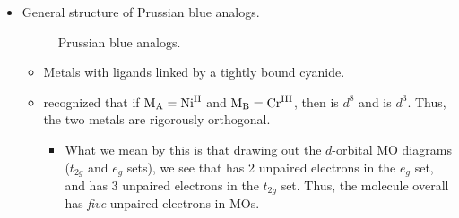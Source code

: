 \documentclass[../notes.tex]{subfiles}
\begin{document}
\begin{itemize}
    \begin{figure}[h!]
        \centering
        \footnotesize
        \chemleft{[}
        \chemright{]^+}
        \caption{Designing a compound with orthogonal electrons.}
        \label{fig:orthogonalElectrons}
    \end{figure}
    \begin{itemize}
        \item The compound in Figure \ref{fig:orthogonalElectrons} is composed of a dipyridyl and semiquinoid ligand on copper. It is overall a monocation.
        \item The unpaired electron on the semiquinoid is rigorously orthogonal to the copper one sinc they are in $d_{x^2-y^2}$ vs. $p_z$ orbitals.
        \item $J>\SI{200}{\per\centi\meter}$ here.
        \item $\chi T$ vs. temperature.
        \begin{itemize}
            \item We see a triplet ground state at super low temperatures.
            \item The slope fits the Boltzmann population of the spin manifold.
        \end{itemize}
    \end{itemize}
    \item General structure of Prussian blue analogs.
    \begin{figure}[h!]
        \centering
        \footnotesize
        \caption{Prussian blue analogs.}
        \label{fig:PrussianBlue}
    \end{figure}
    \begin{itemize}
        \item Metals with ligands linked by a tightly bound cyanide.
        \item \textcite{bib:PrussianBlue} recognized that if $\ce{M_A}=\ce{Ni^{II}}$ and $\ce{M_B}=\ce{Cr^{III}}$, then  is $d^8$ and  is $d^3$. Thus, the two metals are rigorously orthogonal.
        \begin{itemize}
            \item What we mean by this is that drawing out the $d$-orbital MO diagrams ($t_{2g}$ and $e_g$ sets), we see that  has 2 unpaired electrons in the $e_g$ set, and  has 3 unpaired electrons in the $t_{2g}$ set. Thus, the molecule overall has \emph{five} unpaired electrons in MOs.

\end{itemize}
\end{itemize}
\end{itemize}
\end{document}
